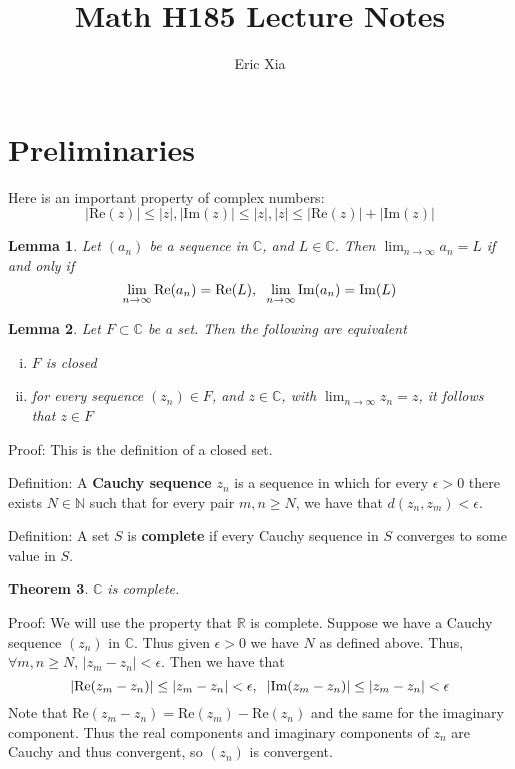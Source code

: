 \documentclass[11pt]{article}
\title{Math H185 Lecture Notes}
\author{Eric Xia}
\theoremstyle{plain}
\newtheorem{theorem}{Theorem}[section]
\newtheorem{lemma}[theorem]{Lemma}
\theoremstyle{definition}
\begin{document}
\maketitle

\section{Preliminaries}

Here is an important property of complex numbers:
$$ |\text{Re}(z)| \leq |z|, |\text{Im}(z)| \leq |z|, |z| \leq |\text{Re}(z)| + |\text{Im}(z)| $$

\begin{lemma}
Let $(a_n)$ be a sequence in $\mathbb{C}$, and $L \in \mathbb{C}$. Then $\lim_{n \to \infty} a_n = L$ if and only if 
$$ \lim_{n \to \infty} \text{Re}(a_n) = \text{Re}(L), \hspace{2mm} \lim_{n \to \infty} \text{Im}(a_n) = \text{Im}(L) $$
\end{lemma}

\begin{lemma}
Let $F \subset \mathbb{C}$ be a set. Then the following are equivalent
\begin{enumerate}[(i)]
\item $F$ is closed
\item for every sequence $(z_n) \in F$, and $z \in \mathbb{C}$, with $\lim_{n \to \infty} z_n = z$, it follows that $z \in F$
\end{enumerate}
\end{lemma}

Proof: This is the definition of a closed set.
\newline

\noindent
Definition: A \textbf{Cauchy sequence} $z_n$ is a sequence in which for every $\epsilon > 0$ there exists $N \in \mathbb{N}$ such that for every pair $m, n \geq N$, we have that $d(z_n, z_m) < \epsilon$.
\newline

\noindent
Definition: A set $S$ is \textbf{complete} if every Cauchy sequence in $S$ converges to some value in $S$.

\begin{theorem}
$\mathbb{C}$ is complete.
\end{theorem}

Proof: We will use the property that $\mathbb{R}$ is complete. Suppose we have a Cauchy sequence $(z_n)$ in $\mathbb{C}$. Thus given $\epsilon > 0$ we have $N$ as defined above. Thus, $\forall m,n \geq N$, $|z_m - z_n| < \epsilon$. Then we have that 
$$ |\text{Re}(z_m - z_n)| \leq |z_m - z_n| < \epsilon, \hspace{2mm} |\text{Im}(z_m - z_n)| \leq |z_m - z_n| < \epsilon $$
Note that $\text{Re}(z_m - z_n) = \text{Re}(z_m) - \text{Re}(z_n)$ and the same for the imaginary component. Thus the real components and imaginary components of $z_n$ are Cauchy and thus convergent, so $(z_n)$ is convergent. 
\end{document}
